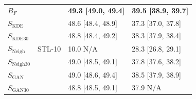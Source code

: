 \begin{table}[ht!]
\begin{minipage}[t]{0.98\textwidth}
{\begin{tabularx}{0.6\linewidth}{lcll}
$B_F$                & \multirow{7}{*}{STL-10}   & \textbf{49.3 {[}49.0, 49.4{]}} & \textbf{39.5 {[}38.9, 39.7{]}} \\
$S_{\text{KDE}}$     &                           & 48.6 {[}48.4, 48.9{]}          & 37.3 {[}37.0, 37.8{]}          \\
$S_{\text{KDE}30}$   &                           & 48.8 {[}48.4, 49.2{]}          & 38.3 {[}37.9, 38.4{]}          \\
$S_{\text{Neigh}}$   &                           & 10.0 N/A                       & 28.3 {[}26.8, 29.1{]}          \\
$S_{\text{Neigh}30}$ &                           & 49.0 {[}48.5, 49.1{]}          & 37.8 {[}37.6, 38.2{]}          \\
$S_{\text{GAN}}$     &                           & 49.0 {[}48.6, 49.4{]}          & 38.5 {[}37.9, 38.9{]}          \\
$S_{\text{GAN}30}$   &                           & 48.8 {[}48.5, 49.1{]}          & 37.9 N/A                      \\
\bottomrule
\end{tabularx}
}
\label{tab:accuracy_natural_images}
\end{minipage}
\vspace{-.2in}
\end{table}
